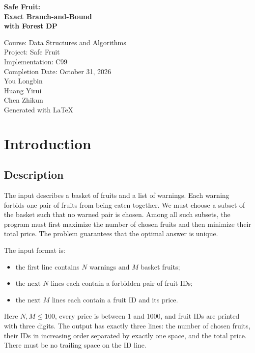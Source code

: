 \documentclass[12pt,a4paper]{report}
\begin{document}
\begin{center}
{\Huge\bfseries Safe Fruit:\\[0.35cm]
 Exact Branch-and-Bound\\[0.35cm]
 with Forest DP\par}
\vspace{1.3cm}
\Large Course: Data Structures and Algorithms\\[.35cm]
\Large Project: Safe Fruit\\[.35cm]
\Large Implementation: C99\\[.35cm]
\Large Completion Date: October 31, 2026\\[1.2cm]
\Large You Longbin \\[.4cm]
\Large Huang Yirui \\[.4cm]
\Large Chen Zhikun \\[1.2cm]
\Large Generated with \LaTeX
\end{center}
\newpage
{\small
\tableofcontents
}
\newpage

\chapter{Introduction}

\section{Description}

The input describes a basket of fruits and a list of warnings.  Each warning
forbids one pair of fruits from being eaten together.  We must choose a subset
of the basket such that no warned pair is chosen.  Among all such subsets, the
program must first maximize the number of chosen fruits and then minimize their
total price.  The problem guarantees that the optimal answer is unique.

The input format is:
\begin{itemize}
\item the first line contains $N$ warnings and $M$ basket fruits;
\item the next $N$ lines each contain a forbidden pair of fruit IDs;
\item the next $M$ lines each contain a fruit ID and its price.
\end{itemize}
Here $N,M\le 100$, every price is between 1 and 1000, and fruit IDs are printed
with three digits.  The output has exactly three lines: the number of chosen
fruits, their IDs in increasing order separated by exactly one space, and the
total price.  There must be no trailing space on the ID line.
\end{document}
